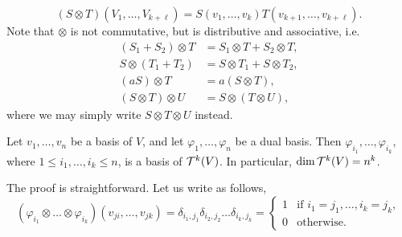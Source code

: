 \[ (S \otimes T)(V_1, \dots, V_{k+\ell}) = S(v_1, \dots, v_k) T(v_{k+1}, \dots, v_{k+\ell}). \]
Note that $\otimes$ is not commutative, but is distributive and associative, i.e.
\begin{align*}
    (S_1 + S_2) \otimes T &= S_1 \otimes T + S_2 \otimes T, \\
    S \otimes (T_1 + T_2) &= S \otimes T_1 + S \otimes T_2, \\
    (aS) \otimes T &= a(S \otimes T), \\
    (S \otimes T) \otimes U &= S \otimes (T \otimes U),
\end{align*}
where we may simply write $S \otimes T \otimes U$ instead.
\begin{simpleprop}
    Let $v_1, \dots, v_n$ be a basis of $V$, and let $\varphi_1, \dots, \varphi_n$ be a dual basis. Then $\varphi_{i_1}, \dots, \varphi_{i_k}$, where $1 \leq i_1, \dots, i_k \leq n$, is a basis of $\mathcal T^k(V)$. In particular, $\dim \mathcal T^k(V) = n^k$.
\end{simpleprop}
\noindent The proof is straightforward. Let us write as follows,
\[ (\varphi_{i_1} \otimes \dots \otimes \varphi_{i_k})(v_{ji}, \dots, v_{jk}) = \delta_{i_1,j_1} \delta_{i_2,j_2} \dots \delta_{i_k,j_k} = \begin{cases} 1 & \text{if } i_1 = j_1, \dots, i_k = j_k, \\0 & \text{otherwise.} \end{cases} \]